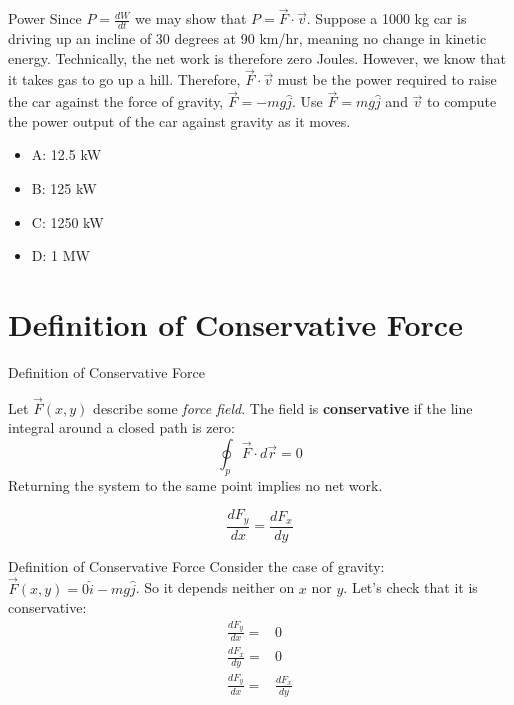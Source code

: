 \documentclass{beamer}
\begin{document}
\begin{frame}{Power}
Since $P = \frac{dW}{dt}$ we may show that $P = \vec{F} \cdot \vec{v}$.  Suppose a 1000 kg car is driving up an incline of 30 degrees at 90 km/hr, meaning no change in kinetic energy.  Technically, the net work is therefore zero Joules.  However, we know that it takes gas to go up a hill.  Therefore, $\vec{F} \cdot \vec{v}$ must be the power required to raise the car against the force of gravity, $\vec{F} = -mg\hat{j}$.  Use $\vec{F} = mg\hat{j}$ and $\vec{v}$ to compute the power output of the car against gravity as it moves.
\begin{itemize}
\item A: 12.5 kW
\item B: 125 kW
\item C: 1250 kW
\item D: 1 MW
\end{itemize}
\end{frame}

\section{Definition of Conservative Force}

\begin{frame}{Definition of Conservative Force}
\begin{tcolorbox}[colback=white,colframe=red!40!blue,title=Definition of Conservative Force]
\alert{Let $\vec{F}(x,y)$ describe some \textit{force field}.  The field is \textbf{conservative} if the line integral around a closed path is zero: \\
\begin{equation}
\oint_{p} \vec{F} \cdot d\vec{r} = 0
\end{equation}
Returning the system to the same point implies no net work.}
\end{tcolorbox}
\begin{tcolorbox}[colback=white,colframe=red!40!blue,title=Corollary 1]
\begin{equation}
\frac{dF_y}{dx} = \frac{dF_x}{dy}
\end{equation}
\end{tcolorbox}
\end{frame}

\begin{frame}{Definition of Conservative Force}
Consider the case of gravity: $\vec{F}(x,y) = 0\hat{i} -mg \hat{j}$.  So it depends neither on $x$ nor $y$.  Let's check that it is conservative:
\begin{align}
\frac{dF_y}{dx} =& 0 \\
\frac{dF_x}{dy} =& 0 \\
\frac{dF_y}{dx} =& \frac{dF_x}{dy}
\end{align}
\end{frame}
\end{document}
